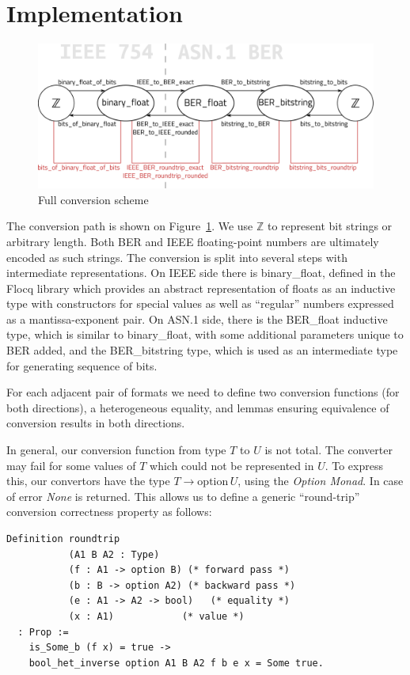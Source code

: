 \documentclass[sigplan]{acmart}
\newcommand{\Z}{\mathbb{Z}}
\begin{document}
\section{Implementation}
\label{sec:imp}
\begin{figure}[h!]
  \includegraphics[width=\columnwidth]{diagram.eps}
  \caption{Full conversion scheme}
  \label{fig:figure1}
\end{figure}

The conversion path is shown on Figure~\ref{fig:figure1}. We use $\Z$ to
represent bit strings or arbitrary length. Both BER and IEEE floating-point
numbers are ultimately encoded as such strings. The conversion is split into
several steps with intermediate representations. On IEEE side there is
binary\_float, defined in the Flocq \cite{boldo2011flocq} library which provides
an abstract representation of floats as an inductive type with constructors for
special values as well as ``regular'' numbers expressed as a mantissa-exponent
pair. On ASN.1 side, there is the BER\_float inductive type, which is similar
to binary\_float, with some additional parameters unique to BER added, and the BER\_bitstring type, which is used as an intermediate type for generating sequence of bits.

For each adjacent pair of formats we need to define two conversion functions
(for both directions), a heterogeneous equality, and lemmas ensuring equivalence
of conversion results in both directions.

In general, our conversion function from type $T$ to $U$ is not total.
The converter may fail for some values of $T$ which could not be
represented in $U$. To express this, our
convertors have the type $T \rightarrow \mathrm{option}\, U$, using the
\emph{Option Monad}. In case of error \emph{None} is returned.
This allows us to define a generic ``round-trip'' conversion correctness property as follows:

\begin{lstlisting}[language=Coq, mathescape=true,
  basicstyle=\footnotesize]
Definition roundtrip
           (A1 B A2 : Type)
           (f : A1 -> option B) (* forward pass *)
           (b : B -> option A2) (* backward pass *)
           (e : A1 -> A2 -> bool)   (* equality *)
           (x : A1)            (* value *)
  : Prop :=
    is_Some_b (f x) = true ->
    bool_het_inverse option A1 B A2 f b e x = Some true.
\end{lstlisting}
\end{document}
